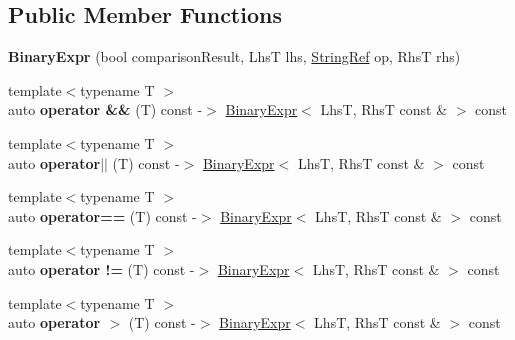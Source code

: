 \subsection*{Public Member Functions}
\begin{DoxyCompactItemize}
\item 
\mbox{\label{classCatch_1_1BinaryExpr_a657d66346aef97a760c22776fe6008b6}} 
{\bfseries Binary\+Expr} (bool comparison\+Result, LhsT lhs, \mbox{\hyperlink{classCatch_1_1StringRef}{String\+Ref}} op, RhsT rhs)
\item 
\mbox{\label{classCatch_1_1BinaryExpr_a46d218bd9e184e6b9a940df77c64f729}} 
{\footnotesize template$<$typename T $>$ }\\auto {\bfseries operator \&\&} (T) const -\/$>$ \mbox{\hyperlink{classCatch_1_1BinaryExpr}{Binary\+Expr}}$<$ LhsT, RhsT const \& $>$ const
\item 
\mbox{\label{classCatch_1_1BinaryExpr_a331e53968b1a2f92827c35721cc7eded}} 
{\footnotesize template$<$typename T $>$ }\\auto {\bfseries operator$\vert$$\vert$} (T) const -\/$>$ \mbox{\hyperlink{classCatch_1_1BinaryExpr}{Binary\+Expr}}$<$ LhsT, RhsT const \& $>$ const
\item 
\mbox{\label{classCatch_1_1BinaryExpr_a245bffd2aab2f560814739986710aaf1}} 
{\footnotesize template$<$typename T $>$ }\\auto {\bfseries operator==} (T) const -\/$>$ \mbox{\hyperlink{classCatch_1_1BinaryExpr}{Binary\+Expr}}$<$ LhsT, RhsT const \& $>$ const
\item 
\mbox{\label{classCatch_1_1BinaryExpr_a4bbd87a1dc9759185432fce44765d4f5}} 
{\footnotesize template$<$typename T $>$ }\\auto {\bfseries operator !=} (T) const -\/$>$ \mbox{\hyperlink{classCatch_1_1BinaryExpr}{Binary\+Expr}}$<$ LhsT, RhsT const \& $>$ const
\item 
\mbox{\label{classCatch_1_1BinaryExpr_a93f643d30d7617ab7a2a50dfaccde029}} 
{\footnotesize template$<$typename T $>$ }\\auto {\bfseries operator $>$} (T) const -\/$>$ \mbox{\hyperlink{classCatch_1_1BinaryExpr}{Binary\+Expr}}$<$ LhsT, RhsT const \& $>$ const

\end{DoxyCompactItemize}
